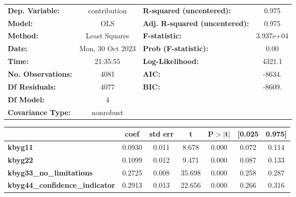\begin{center}
\begin{tabular}{lclc}
\toprule
\textbf{Dep. Variable:}                &   contribution   & \textbf{  R-squared (uncentered):}      &     0.975   \\
\textbf{Model:}                        &       OLS        & \textbf{  Adj. R-squared (uncentered):} &     0.975   \\
\textbf{Method:}                       &  Least Squares   & \textbf{  F-statistic:       }          & 3.937e+04   \\
\textbf{Date:}                         & Mon, 30 Oct 2023 & \textbf{  Prob (F-statistic):}          &     0.00    \\
\textbf{Time:}                         &     21:35:55     & \textbf{  Log-Likelihood:    }          &    4321.1   \\
\textbf{No. Observations:}             &        4081      & \textbf{  AIC:               }          &    -8634.   \\
\textbf{Df Residuals:}                 &        4077      & \textbf{  BIC:               }          &    -8609.   \\
\textbf{Df Model:}                     &           4      & \textbf{                     }          &             \\
\textbf{Covariance Type:}              &    nonrobust     & \textbf{                     }          &             \\
\bottomrule
\end{tabular}
\begin{tabular}{lcccccc}
                                       & \textbf{coef} & \textbf{std err} & \textbf{t} & \textbf{P$> |$t$|$} & \textbf{[0.025} & \textbf{0.975]}  \\
\midrule
\textbf{kbyg11}                        &       0.0930  &        0.011     &     8.678  &         0.000        &        0.072    &        0.114     \\
\textbf{kbyg22}                        &       0.1099  &        0.012     &     9.471  &         0.000        &        0.087    &        0.133     \\
\textbf{kbyg33\_no\_limitations}       &       0.2725  &        0.008     &    35.698  &         0.000        &        0.258    &        0.287     \\
\textbf{kbyg44\_confidence\_indicator} &       0.2913  &        0.013     &    22.656  &         0.000        &        0.266    &        0.316     \\

\end{tabular}
\end{center}
